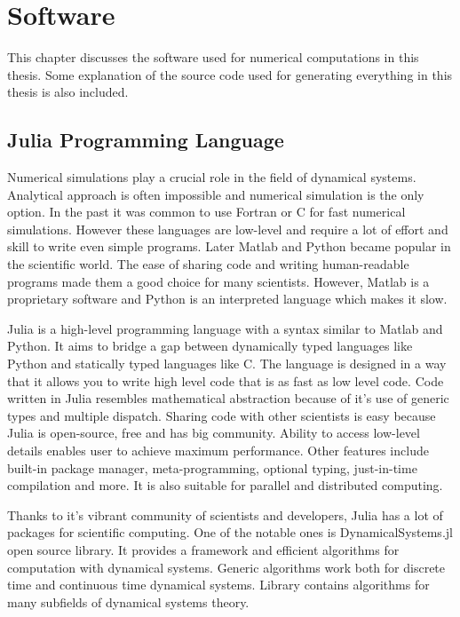 \chapter{Software}
\label{sec:software}

This chapter discusses the software used for numerical computations in this thesis.
Some explanation of the source code used for generating everything in this thesis is also included.

\section{Julia Programming Language}
Numerical simulations play a crucial role in the field of dynamical systems.
Analytical approach is often impossible and numerical simulation is the only option.
In the past it was common to use Fortran or C for fast numerical simulations.
However these languages are low-level and require a lot of effort and skill to write even simple programs.
Later Matlab and Python became popular in the scientific world.
The ease of sharing code and writing human-readable programs made them a good choice for many scientists.
However, Matlab is a proprietary software and Python is an interpreted language which makes it slow.
\par
Julia is a high-level programming language with a syntax similar to Matlab and Python.
It aims to bridge a gap between dynamically typed languages like Python and statically typed languages like C.
The language is designed in a way that it allows you to write high level code that is as fast as low level code.
Code written in Julia resembles mathematical abstraction because of it's use of generic types and multiple dispatch. 
Sharing code with other scientists is easy because Julia is open-source, free and has big community. 
Ability to access low-level details enables user to achieve maximum performance.
Other features include built-in package manager, meta-programming, optional typing, just-in-time compilation and more.
It is also suitable for parallel and distributed computing. \cite{Bezanson2017,Bezanson20181024}
\par
Thanks to it's vibrant community of scientists and developers, Julia has a lot of packages for scientific computing.
One of the notable ones is DynamicalSystems.jl open source library.
It provides a framework and efficient algorithms for computation with dynamical systems.
Generic algorithms work both for discrete time and continuous time dynamical systems.
Library contains algorithms for many subfields of dynamical systems theory. \cite{Datseris2018}
